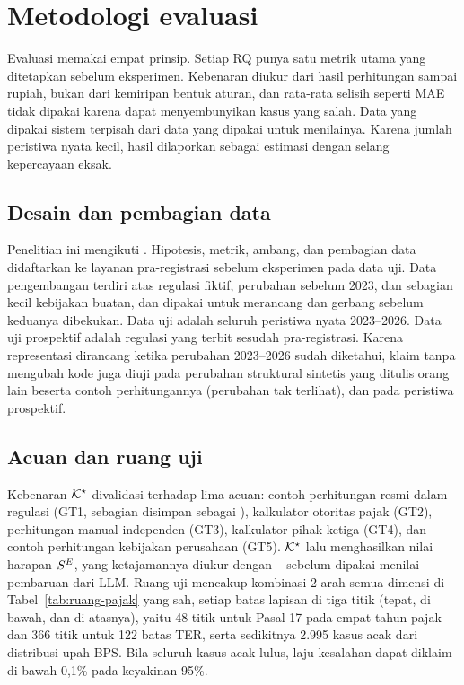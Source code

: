 \section{Metodologi evaluasi}
\label{sec:evaluasi}

Evaluasi memakai empat prinsip. Setiap RQ punya satu metrik utama yang ditetapkan sebelum eksperimen. Kebenaran diukur dari hasil perhitungan sampai rupiah, bukan dari kemiripan bentuk aturan, dan rata-rata selisih seperti MAE tidak dipakai karena dapat menyembunyikan kasus yang salah. Data yang dipakai sistem terpisah dari data yang dipakai untuk menilainya. Karena jumlah peristiwa nyata kecil, hasil dilaporkan sebagai estimasi dengan selang kepercayaan eksak.

\subsection{Desain dan pembagian data}
Penelitian ini mengikuti . Hipotesis, metrik, ambang, dan pembagian data didaftarkan ke layanan pra-registrasi sebelum eksperimen pada data uji. Data pengembangan terdiri atas regulasi fiktif, perubahan sebelum 2023, dan sebagian kecil kebijakan buatan, dan dipakai untuk merancang  dan gerbang sebelum keduanya dibekukan. Data uji adalah seluruh peristiwa nyata 2023--2026. Data uji prospektif adalah regulasi yang terbit sesudah pra-registrasi. Karena representasi dirancang ketika perubahan 2023--2026 sudah diketahui, klaim tanpa mengubah kode juga diuji pada perubahan struktural sintetis yang ditulis orang lain beserta contoh perhitungannya (perubahan tak terlihat), dan pada peristiwa prospektif.

\subsection{Acuan dan ruang uji}
Kebenaran $\mathcal{K}^{\star}$ divalidasi terhadap lima acuan: contoh perhitungan resmi dalam regulasi (GT1, sebagian disimpan sebagai ), kalkulator otoritas pajak (GT2), perhitungan manual independen (GT3), kalkulator pihak ketiga (GT4), dan contoh perhitungan kebijakan perusahaan (GT5). $\mathcal{K}^{\star}$ lalu menghasilkan nilai harapan $S^{E}$, yang ketajamannya diukur dengan ~\cite{petrovic2021mutation} sebelum dipakai menilai pembaruan dari LLM. Ruang uji mencakup kombinasi 2-arah semua dimensi di Tabel~\ref{tab:ruang-pajak} yang sah, setiap batas lapisan di tiga titik (tepat, di bawah, dan di atasnya), yaitu 48 titik untuk Pasal 17 pada empat tahun pajak dan 366 titik untuk 122 batas TER, serta sedikitnya 2.995 kasus acak dari distribusi upah BPS. Bila seluruh kasus acak lulus, laju kesalahan dapat diklaim di bawah 0,1\% pada keyakinan 95\%.

